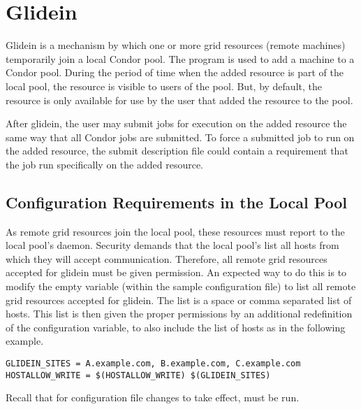 \section{\label{sec:Glidein}Glidein}

Glidein is a mechanism by which one or more grid resources (remote machines)
temporarily join a local Condor pool. 
The program  is used to add a machine
to a Condor pool.
During the period of time when the added resource is
part of the local pool, the resource is visible 
to users of the pool.
But, by default, the resource is only available for
use by the user
that added the resource to the pool.

After glidein, the user may submit jobs for execution on the
added resource the same way that all Condor jobs are submitted.
To force a submitted job to run on the added resource, the
submit description file could contain a requirement that the job run 
specifically on the added resource.


\subsection{Configuration Requirements in the Local Pool}

As remote grid resources join the local pool,
these resources must report to the local pool's  daemon.
Security demands that the local pool's  
list all hosts from which they will accept communication.
Therefore, all remote grid resources accepted for glidein
must be given
 permission.
An expected way to do this is to modify the empty variable
(within the sample configuration file)
 to list all remote grid resources
accepted for glidein.
The list is a space or comma separated list of hosts.
This list is then given the proper permissions by an additional
redefinition of the  configuration variable,
to also include the list of hosts
as in the following example.

\footnotesize
\begin{verbatim}
GLIDEIN_SITES = A.example.com, B.example.com, C.example.com
HOSTALLOW_WRITE = $(HOSTALLOW_WRITE) $(GLIDEIN_SITES)
\end{verbatim}
\normalsize
Recall that for configuration file changes to take effect,
 must be run.

